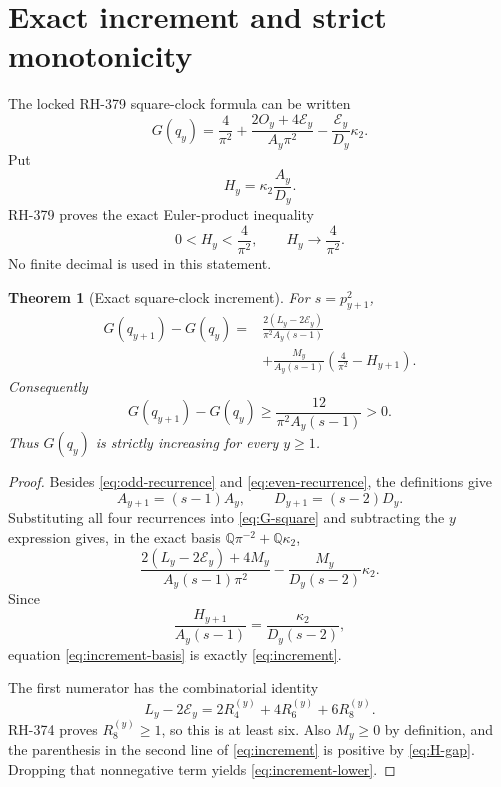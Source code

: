 \documentclass[11pt]{article}
\newtheorem{theorem}{Theorem}[section]
\theoremstyle{definition}
\theoremstyle{remark}
\newcommand{\kap}{\kappa_2}
\newcommand{\Ecal}{\mathcal E}
\begin{document}
\section{Exact increment and strict monotonicity}

The locked RH-379 square-clock formula can be written
\begin{equation}
 G(q_y)=\frac{4}{\pi^2}
       +\frac{2O_y+4\Ecal_y}{A_y\pi^2}
       -\frac{\Ecal_y}{D_y}\kap.
 \label{eq:G-square}
\end{equation}
Put
\begin{equation}
 H_y=\kap\frac{A_y}{D_y}.
 \label{eq:H}
\end{equation}
RH-379 proves the exact Euler-product inequality
\begin{equation}
                         0<H_y<\frac4{\pi^2},\qquad
                         H_y\longrightarrow\frac4{\pi^2}.
 \label{eq:H-gap}
\end{equation}
No finite decimal is used in this statement.

\begin{theorem}[Exact square-clock increment]
\label{thm:increment}
For $s=p_{y+1}^2$,
\begin{equation}
\boxed{\begin{aligned}
G(q_{y+1})-G(q_y)
={}&\frac{2(L_y-2\Ecal_y)}{\pi^2A_y(s-1)}\\
&+\frac{M_y}{A_y(s-1)}
 \left(\frac4{\pi^2}-H_{y+1}\right).
\end{aligned}}
\label{eq:increment}
\end{equation}
Consequently
\begin{equation}
 G(q_{y+1})-G(q_y)
 \ge \frac{12}{\pi^2A_y(s-1)}>0.
 \label{eq:increment-lower}
\end{equation}
Thus $G(q_y)$ is strictly increasing for every $y\ge1$.
\end{theorem}

\begin{proof}
Besides \eqref{eq:odd-recurrence} and
\eqref{eq:even-recurrence}, the definitions give
\[
 A_{y+1}=(s-1)A_y,\qquad D_{y+1}=(s-2)D_y.
\]
Substituting all four recurrences into \eqref{eq:G-square} and subtracting
the $y$ expression gives, in the exact basis
$\mathbb Q\pi^{-2}+\mathbb Q\kap$,
\begin{equation}
 \frac{2(L_y-2\Ecal_y)+4M_y}{A_y(s-1)\pi^2}
 -\frac{M_y}{D_y(s-2)}\kap.
 \label{eq:increment-basis}
\end{equation}
Since
\[
 \frac{H_{y+1}}{A_y(s-1)}
 =\frac{\kap}{D_y(s-2)},
\]
equation \eqref{eq:increment-basis} is exactly
\eqref{eq:increment}.

The first numerator has the combinatorial identity
\begin{equation}
 L_y-2\Ecal_y
 =2R_4^{(y)}+4R_6^{(y)}+6R_8^{(y)}.
 \label{eq:X}
\end{equation}
RH-374 proves $R_8^{(y)}\ge1$, so this is at least six.  Also $M_y\ge0$
by definition, and the parenthesis in the second line of
\eqref{eq:increment} is positive by \eqref{eq:H-gap}.  Dropping that
nonnegative term yields \eqref{eq:increment-lower}.
\end{proof}
\end{document}
